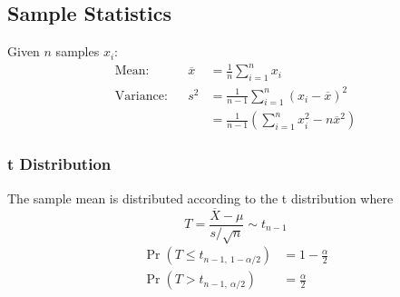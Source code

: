 \documentclass{article}
\begin{document}
\begin{minipage}{62.39259259mm}
    \subsection*{Sample Statistics}
    Given $n$ samples $x_i$:
    \begin{align*}
        \text{Mean:}     &  & \overline{x} & = \frac{1}{n}\sum_{i=1}^{n} x_i                                      \\
        \text{Variance:} &  & s^2          & = \frac{1}{n-1}\sum_{i=1}^{n} \left( x_i - \overline{x} \right)^2    \\
                         &  &              & = \frac{1}{n-1}\left( \sum_{i=1}^{n} x_i^2 - n\overline{x}^2 \right)
    \end{align*}
    \subsubsection*{t Distribution}
    The sample mean is distributed according to the t distribution where
    \begin{equation*}
        T=\frac{\overline{X} - \mu}{s/\sqrt{n}}\sim t_{n-1}
    \end{equation*}
    \begin{align*}
        \Pr{\left( T \leq t_{n-1,\: 1-\alpha/2} \right)} & = 1 - \frac{\alpha}{2} \\
        \Pr{\left( T > t_{n-1,\: \alpha/2} \right)}      & = \frac{\alpha}{2}
    \end{align*}
\end{minipage}\hfill%
\end{document}

